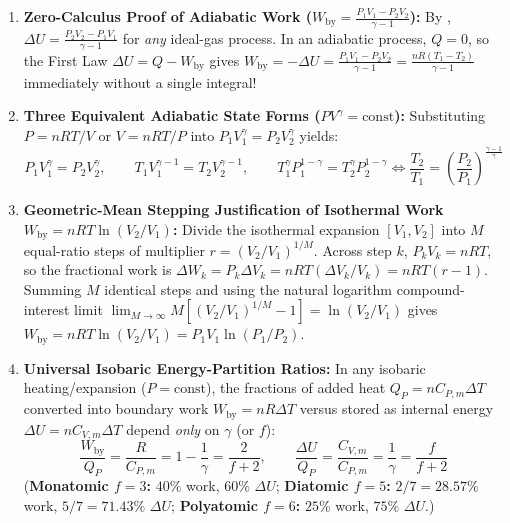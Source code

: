 \begin{derivation}
\begin{enumerate}
  \item \textbf{Zero-Calculus Proof of Adiabatic Work ($W_{\mathrm{by}} = \frac{P_1V_1 - P_2V_2}{\gamma - 1}$):}
  By , $\Delta U = \frac{P_2V_2 - P_1V_1}{\gamma - 1}$ for \emph{any} ideal-gas process. In an adiabatic process, $Q = 0$, so the First Law $\Delta U = Q - W_{\mathrm{by}}$ gives $W_{\mathrm{by}} = -\Delta U = \frac{P_1V_1 - P_2V_2}{\gamma - 1} = \frac{nR(T_1 - T_2)}{\gamma - 1}$ immediately without a single integral!
  \item \textbf{Three Equivalent Adiabatic State Forms ($PV^\gamma = \mathrm{const}$):} Substituting $P = nRT/V$ or $V = nRT/P$ into $P_1V_1^\gamma = P_2V_2^\gamma$ yields:
  \begin{equation}\label{eq:07:adiabatic-laws}
    \boxed{P_1 V_1^\gamma = P_2 V_2^\gamma}, \qquad \boxed{T_1 V_1^{\gamma - 1} = T_2 V_2^{\gamma - 1}}, \qquad \boxed{T_1^\gamma P_1^{1 - \gamma} = T_2^\gamma P_2^{1 - \gamma} \iff \frac{T_2}{T_1} = \left(\frac{P_2}{P_1}\right)^{\frac{\gamma - 1}{\gamma}}}
  \end{equation}
  \item \textbf{Geometric-Mean Stepping Justification of Isothermal Work $W_{\mathrm{by}} = nRT\ln(V_2/V_1)$:}
  Divide the isothermal expansion $[V_1, V_2]$ into $M$ equal-ratio steps of multiplier $r = (V_2/V_1)^{1/M}$. Across step $k$, $P_k V_k = nRT$, so the fractional work is $\Delta W_k = P_k \Delta V_k = nRT(\Delta V_k / V_k) = nRT(r - 1)$. Summing $M$ identical steps and using the natural logarithm compound-interest limit $\lim_{M\to\infty} M[(V_2/V_1)^{1/M} - 1] = \ln(V_2/V_1)$ gives $W_{\mathrm{by}} = nRT\ln(V_2/V_1) = P_1V_1\ln(P_1/P_2)$.
  \item \textbf{Universal Isobaric Energy-Partition Ratios:} In any isobaric heating/expansion ($P = \mathrm{const}$), the fractions of added heat $Q_P = nC_{P,m}\Delta T$ converted into boundary work $W_{\mathrm{by}} = nR\Delta T$ versus stored as internal energy $\Delta U = nC_{V,m}\Delta T$ depend \emph{only} on $\gamma$ (or $f$):
  \begin{equation}\label{eq:07:isobaric-partition}
    \boxed{\frac{W_{\mathrm{by}}}{Q_P} = \frac{R}{C_{P,m}} = 1 - \frac{1}{\gamma} = \frac{2}{f + 2}}, \qquad \boxed{\frac{\Delta U}{Q_P} = \frac{C_{V,m}}{C_{P,m}} = \frac{1}{\gamma} = \frac{f}{f + 2}}
  \end{equation}
  (\textbf{Monatomic $f=3$:} $40\%$ work, $60\%$ $\Delta U$; \textbf{Diatomic $f=5$:} $2/7 = 28.57\%$ work, $5/7 = 71.43\%$ $\Delta U$; \textbf{Polyatomic $f=6$:} $25\%$ work, $75\%$ $\Delta U$.)
\end{enumerate}
\end{derivation}

